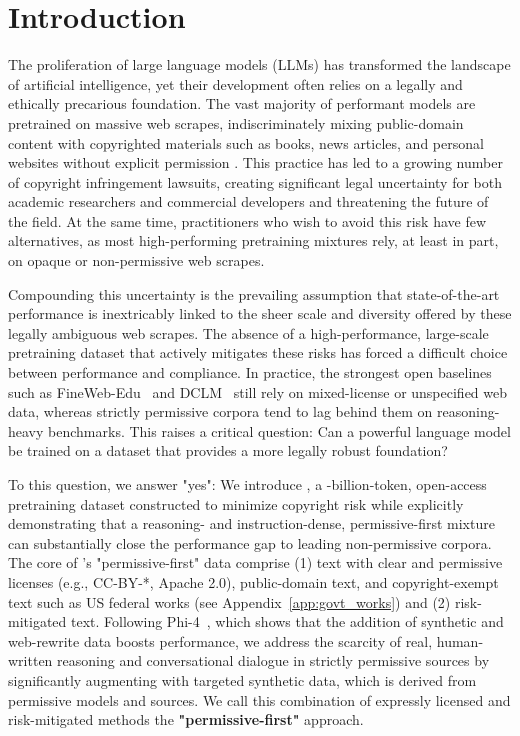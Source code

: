 \section{Introduction}

The proliferation of large language models (LLMs) has transformed the landscape of artificial intelligence, yet their development often relies on a legally and ethically precarious foundation. The vast majority of performant models are pretrained on massive web scrapes, indiscriminately mixing public-domain content with copyrighted materials such as books, news articles, and personal websites without explicit permission \citep{raffel2020exploring, gao2020pile}. This practice has led to a growing number of copyright infringement lawsuits,  creating significant legal uncertainty for both
academic researchers and commercial developers and threatening the future of the field. At the same
time, practitioners who wish to avoid this risk have few alternatives, as most high-performing
pretraining mixtures rely, at least in part, on opaque or non-permissive web scrapes.


Compounding this uncertainty is the prevailing assumption that state-of-the-art performance is inextricably linked to the sheer scale and diversity offered by these legally ambiguous web scrapes. The absence of a high-performance, large-scale pretraining dataset that actively mitigates these risks has forced a difficult choice between performance and compliance. In practice, the strongest open
baselines such as FineWeb-Edu~\citep{penedo2024} and DCLM~\citep{li2024datacomplm} still rely on mixed-license or unspecified web data,
whereas strictly permissive corpora tend to lag behind them on reasoning-heavy benchmarks.
This raises a critical question: Can
a powerful language model be trained on a dataset that provides a more legally robust foundation?

To this question, we answer "yes": We introduce \MixtureVitae{}, a \textbf{\DatasetSize{}}-billion-token, open-access pretraining dataset constructed to minimize copyright risk while explicitly demonstrating that a
reasoning- and instruction-dense, permissive-first mixture can substantially close the performance gap to leading
non-permissive corpora. The core of \MixtureVitae{}'s "permissive-first" data comprise (1) text with clear and permissive licenses (e.g., CC-BY-*, Apache 2.0), public-domain text, and copyright-exempt text such as US federal works (see Appendix~\ref{app:govt_works}) and (2) risk-mitigated text. Following Phi-4~\citep{abdin2024phi4technicalreport}, which shows that the addition of synthetic and web-rewrite data boosts performance, we address the scarcity of real, human-written reasoning and conversational dialogue in strictly permissive sources by significantly augmenting \MixtureVitae{} with targeted synthetic data, which is derived from permissive models and sources. We call this combination of expressly licensed and risk-mitigated methods the \textbf{"permissive-first"} approach. 



